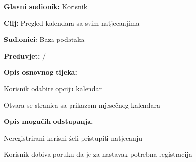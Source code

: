 					
					\noindent {}
					\begin{packed_item}
						
						\item \textbf{Glavni sudionik: }Korisnik
						\item  \textbf{Cilj:} Pregled kalendara sa svim natjecanjima 
						\item  \textbf{Sudionici:} Baza podataka
						\item  \textbf{Preduvjet:} /
						\item  \textbf{Opis osnovnog tijeka:}
						
						\item[] \begin{packed_enum}
							
							\item Korisnik odabire opciju kalendar 
							\item Otvara se stranica sa prikazom mjesečnog kalendara 
							
						\end{packed_enum}
						
						\item  \textbf{Opis mogućih odstupanja:}
						
						\item[] \begin{packed_item}
							
							\item[2.a] Neregistrirani korisni želi pristupiti natjecanju
							\item[] \begin{packed_enum}
								
								\item Korisnik dobiva poruku da je za nastavak potrebna registracija 
								
							\end{packed_enum}
							
							
						\end{packed_item}
					\end{packed_item}
					
